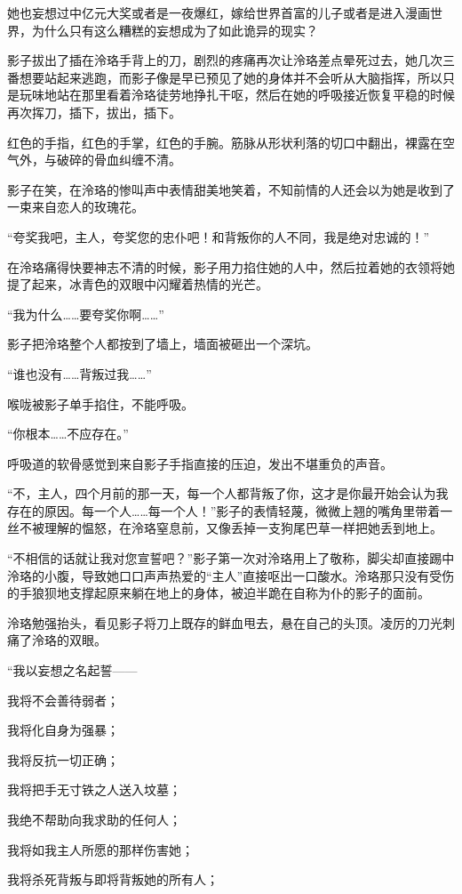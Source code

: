 \documentclass[UTF8, scheme = chinese, openany]{ctexbook}
\begin{document}
她也妄想过中亿元大奖或者是一夜爆红，嫁给世界首富的儿子或者是进入漫画世界，为什么只有这么糟糕的妄想成为了如此诡异的现实？

影子拔出了插在泠珞手背上的刀，剧烈的疼痛再次让泠珞差点晕死过去，她几次三番想要站起来逃跑，而影子像是早已预见了她的身体并不会听从大脑指挥，所以只是玩味地站在那里看着泠珞徒劳地挣扎干呕，然后在她的呼吸接近恢复平稳的时候再次挥刀，插下，拔出，插下。

红色的手指，红色的手掌，红色的手腕。筋脉从形状利落的切口中翻出，裸露在空气外，与破碎的骨血纠缠不清。

影子在笑，在泠珞的惨叫声中表情甜美地笑着，不知前情的人还会以为她是收到了一束来自恋人的玫瑰花。

“夸奖我吧，主人，夸奖您的忠仆吧！和背叛你的人不同，我是绝对忠诚的！”

在泠珞痛得快要神志不清的时候，影子用力掐住她的人中，然后拉着她的衣领将她提了起来，冰青色的双眼中闪耀着热情的光芒。

“我为什么……要夸奖你啊……”

影子把泠珞整个人都按到了墙上，墙面被砸出一个深坑。

“谁也没有……背叛过我……”

喉咙被影子单手掐住，不能呼吸。

“你根本……不应存在。”

呼吸道的软骨感觉到来自影子手指直接的压迫，发出不堪重负的声音。

“不，主人，四个月前的那一天，每一个人都背叛了你，这才是你最开始会认为我存在的原因。每一个人……每一个人！”影子的表情轻蔑，微微上翘的嘴角里带着一丝不被理解的愠怒，在泠珞窒息前，又像丢掉一支狗尾巴草一样把她丢到地上。

“不相信的话就让我对您宣誓吧？”影子第一次对泠珞用上了敬称，脚尖却直接踢中泠珞的小腹，导致她口口声声热爱的“主人”直接呕出一口酸水。泠珞那只没有受伤的手狼狈地支撑起原来躺在地上的身体，被迫半跪在自称为仆的影子的面前。

泠珞勉强抬头，看见影子将刀上既存的鲜血甩去，悬在自己的头顶。凌厉的刀光刺痛了泠珞的双眼。

“我以妄想之名起誓——

我将不会善待弱者；

我将化自身为强暴；

我将反抗一切正确；

我将把手无寸铁之人送入坟墓；

我绝不帮助向我求助的任何人；

我将如我主人所愿的那样伤害她；

我将杀死背叛与即将背叛她的所有人；
\end{document}
